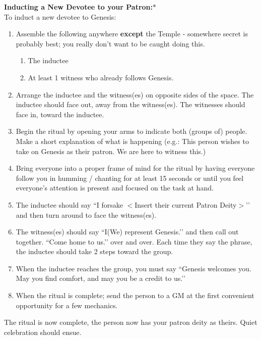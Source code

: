\documentclass[green]{GL2020}
\begin{document}
   
\textbf{Inducting a New Devotee to your Patron:}$*$\\
To induct a new devotee to Genesis:
\begin{enumerate}
  \item Assemble the following anywhere \textbf{except} the Temple - somewhere secret is probably best; you really don’t want to be caught doing this.
  \begin{enumerate}
    \item The inductee
    \item At least 1 witness who already follows Genesis.
  \end{enumerate}
  \item Arrange the inductee and the witness(es) on opposite sides of the space. The inductee should face out, away from the witness(es). The witnesses should face in, toward the inductee.
  \item Begin the ritual by opening your arms to indicate both (groups of) people. Make a short explanation of what is happening (e.g.: This person wishes to take on Genesis as their patron. We are here to witness this.)
  \item Bring everyone into a proper frame of mind for the ritual by having everyone follow you in humming / chanting for at least 15 seconds or until you feel everyone’s attention is present and focused on the task at hand.
  \item The inductee should say ``I forsake $<$Insert their current Patron Deity$>$’’ and then turn around to face the witness(es).
  \item The witness(es) should say ``I(We) represent Genesis.’’ and then call out together. ``Come home to us.’’ over and over. Each time they say the phrase, the inductee should take 2 steps toward the group.
  \item When the inductee reaches the group, you must say ``Genesis welcomes you. May you find comfort, and may you be a credit to us.’’
  \item When the ritual is complete; send the person to a GM at the first convenient opportunity for a few mechanics.
\end{enumerate}

The ritual is now complete, the person now has your patron deity as theirs. Quiet celebration should ensue.
\end{document}
